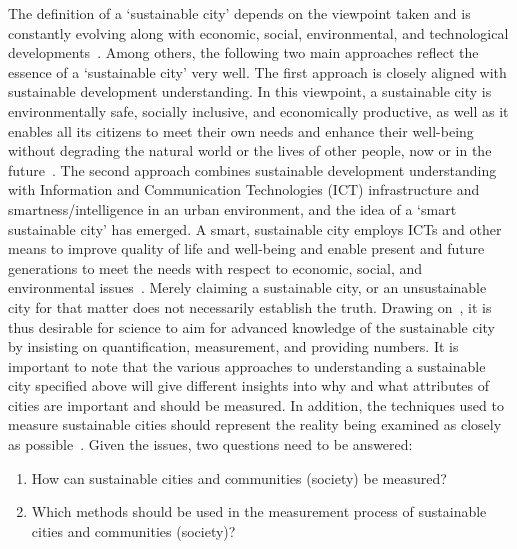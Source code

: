 \documentclass[final,5p,times,twocolumn,authoryear]{elsarticle}
\begin{document}
The definition of a ‘sustainable city’ depends on the viewpoint taken and is constantly evolving along with economic, social, environmental, and technological developments~\citep{itu2014}. Among others, the following two main approaches reflect the essence of a ‘sustainable city’ very well. The first approach is closely aligned with sustainable development understanding. In this viewpoint, a sustainable city is environmentally safe, socially inclusive, and economically productive, as well as it enables all its citizens to meet their own needs and enhance their well-being without degrading the natural world or the lives of other people, now or in the future~\citep{koh2010eco, un2009}. The second approach combines sustainable development understanding with Information and Communication Technologies (ICT) infrastructure and smartness/intelligence in an urban environment, and the idea of a ‘smart sustainable city’ has emerged. A smart, sustainable city employs ICTs and other means to improve quality of life and well-being and enable present and future generations to meet the needs with respect to economic, social, and environmental issues~\citep{itu2014, hojer2015smart}. 
Merely claiming a sustainable city, or an unsustainable city for that matter does not necessarily establish the truth. Drawing on~\citep{subhas2020measures}, it is thus desirable for science to aim for advanced knowledge of the sustainable city by insisting on quantification, measurement, and providing numbers. It is important to note that the various approaches to understanding a sustainable city specified above will give different insights into why and what attributes of cities are important and should be measured. In addition, the techniques used to measure sustainable cities should represent the reality being examined as closely as possible~\citep{reis2019evaluation}. Given the issues, two questions need to be answered:

\begin{enumerate}
    \item {How can sustainable cities and communities (society) be measured?}
    \item {Which methods should be used in the measurement process of sustainable cities and communities (society)?}
\end{enumerate}
\end{document}
